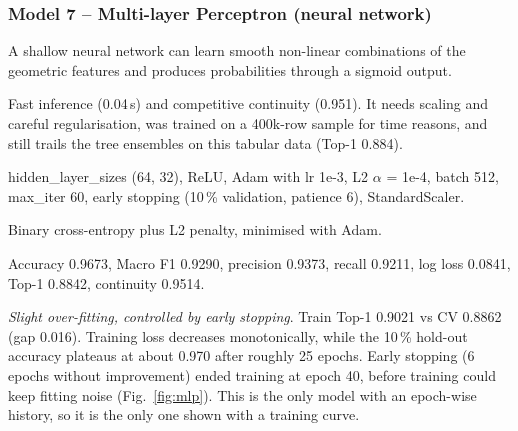 \documentclass[10pt,a4paper]{article}
\newenvironment{qa}{\begin{description}[leftmargin=0pt,labelsep=0.4em,itemsep=2pt,font=\bfseries\color{accent!80!black}]}{\end{description}}
\begin{document}
\subsubsection*{Model 7 -- Multi-layer Perceptron (neural network)}
\begin{qa}
\item[A1. Why suitable?] A shallow neural network can learn smooth non-linear combinations of the geometric features and produces probabilities through a sigmoid output.
\item[A2. Strengths / limitations.] Fast inference (0.04\,s) and competitive continuity (0.951). It needs scaling and careful regularisation, was trained on a 400k-row sample for time reasons, and still trails the tree ensembles on this tabular data (Top-1 0.884).
\item[B5. Hyperparameters.] hidden\_layer\_sizes (64, 32), ReLU, Adam with lr 1e-3, L2 $\alpha$ = 1e-4, batch 512, max\_iter 60, early stopping (10\,\% validation, patience 6), StandardScaler.
\item[B6. Objective.] Binary cross-entropy plus L2 penalty, minimised with Adam.
\item[C7/C8. Student-test.] Accuracy 0.9673, Macro F1 0.9290, precision 0.9373, recall 0.9211, log loss 0.0841, Top-1 0.8842, continuity 0.9514.
\item[C9. Fit.] \emph{Slight over-fitting, controlled by early stopping}. Train Top-1 0.9021 vs CV 0.8862 (gap 0.016). Training loss decreases monotonically, while the 10\,\% hold-out accuracy plateaus at about 0.970 after roughly 25 epochs. Early stopping (6 epochs without improvement) ended training at epoch 40, before training could keep fitting noise (Fig.~\ref{fig:mlp}). This is the only model with an epoch-wise history, so it is the only one shown with a training curve.
\end{qa}
\end{document}
